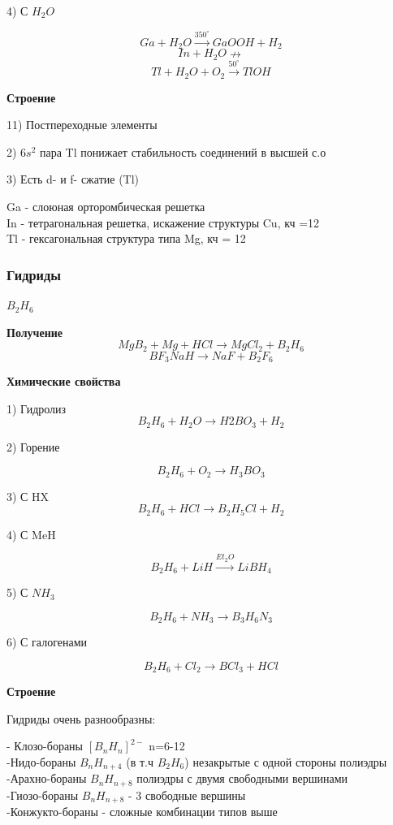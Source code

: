 4) С $H_2O$

$$Ga + H_2O \xrightarrow{350^{\circ}} GaOOH + H_2$$
$$In + H_2O \nrightarrow$$
$$Tl + H_2O + O_2 \xrightarrow{50^{\circ}} TlOH$$

\textbf{Строение}

11) Постпереходные элементы

2) $6s^2$ пара Tl понижает стабильность соединений в высшей с.о

3) Есть d- и f- сжатие (Tl)

Ga - слоюная орторомбическая решетка\\
In - тетрагональная решетка, искажение структуры Cu, кч =12\\
Tl - гексагональная структура типа Mg, кч = 12

\subsubsection*{Гидриды}

$B_2H_6$

\textbf{Получение}
$$MgB_2 + Mg + HCl \rightarrow MgCl_2 + B_2H_6$$
$$BF_3 NaH \rightarrow NaF + B_2F_6$$

\textbf{Химические свойства}

1) Гидролиз 
$$B_2H_6 + H_2O \rightarrow H2BO_3 + H_2$$

2) Горение

$$B_2H_6  + O_2 \rightarrow H_3BO_3$$

3) С HX
$$B_2H_6 + HCl \rightarrow B_2H_5Cl + H_2$$

4) С MeH

$$B_2H_6 + LiH \xrightarrow{Et_2O} LiBH_4$$

5) С $NH_3$

$$B_2H_6 + NH_3 \rightarrow B_3H_6N_3$$

6) С галогенами

$$B_2H_6 + Cl_2 \rightarrow BCl_3 + HCl$$

\textbf{Строение}

Гидриды очень разнообразны:

- Клозо-бораны $[B_nH_n]^{2-}$ n=6-12\\
-Нидо-бораны $B_nH_{n+4}$ (в т.ч $B_2H_6$) незакрытые с одной стороны полиэдры\\
-Арахно-бораны $B_nH_{n+8}$ полиэдры с двумя свободными вершинами\\
-Гиозо-бораны $B_nH_{n+8}$ - 3 свободные вершины\\
-Конжукто-бораны  - сложные комбинации типов выше

